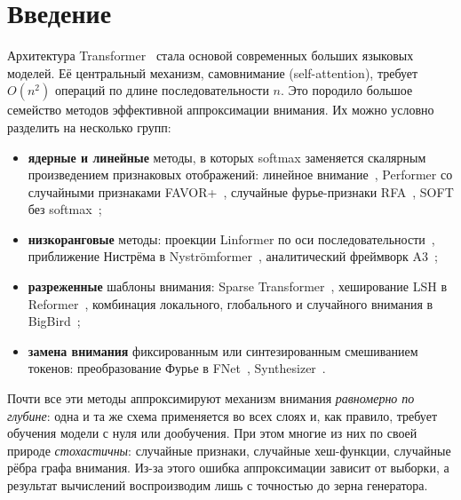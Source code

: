 \section{Введение}

Архитектура Transformer~\cite{vaswani2017attention} стала основой
современных больших языковых моделей. Её центральный механизм,
самовнимание (self-attention), требует $O(n^2)$ операций по длине
последовательности $n$. Это породило большое семейство методов
эффективной аппроксимации внимания. Их можно условно разделить на
несколько групп:
\begin{itemize}
  \item \textbf{ядерные и линейные} методы, в которых softmax заменяется
    скалярным произведением признаковых отображений: линейное
    внимание~\cite{katharopoulos2020rnn}, Performer со случайными
    признаками FAVOR+~\cite{choromanski2021performer}, случайные
    фурье-признаки RFA~\cite{peng2021rfa}, SOFT без
    softmax~\cite{lu2021soft};
  \item \textbf{низкоранговые} методы: проекции Linformer по оси
    последовательности~\cite{wang2020linformer}, приближение Нистрёма
    в Nyströmformer~\cite{xiong2021nystrom}, аналитический фреймворк
    A3~\cite{wong2025a3};
  \item \textbf{разреженные} шаблоны внимания: Sparse
    Transformer~\cite{child2019sparse}, хеширование LSH в
    Reformer~\cite{kitaev2020reformer}, комбинация локального,
    глобального и случайного внимания в BigBird~\cite{zaheer2020bigbird};
  \item \textbf{замена внимания} фиксированным или
    синтезированным смешиванием токенов: преобразование Фурье в
    FNet~\cite{leethorp2022fnet}, Synthesizer~\cite{tay2021synthesizer}.
\end{itemize}

Почти все эти методы аппроксимируют механизм внимания \emph{равномерно
по глубине}: одна и та же схема применяется во всех слоях и, как
правило, требует обучения модели с нуля или дообучения. При этом
многие из них по своей природе \emph{стохастичны}: случайные признаки,
случайные хеш-функции, случайные рёбра графа внимания. Из-за этого
ошибка аппроксимации зависит от выборки, а результат вычислений
воспроизводим лишь с точностью до зерна генератора.

